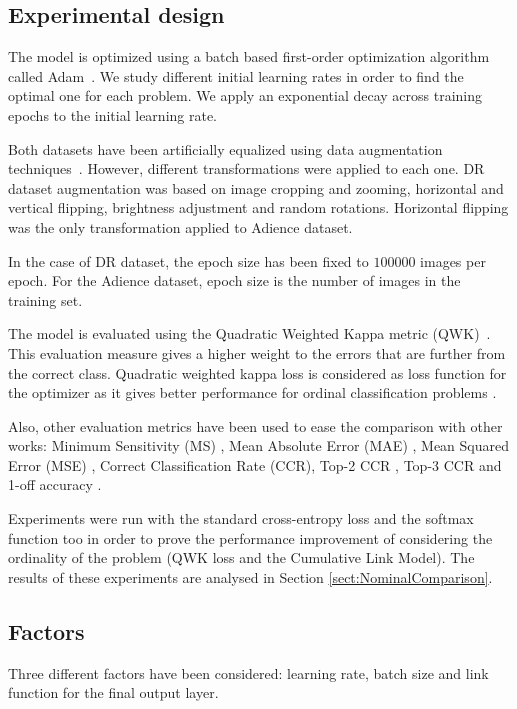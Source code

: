 \documentclass[journal]{IEEEtran}
\begin{document}
	\subsection{Experimental design}
	\label{sect:settings}
	The model is optimized using a batch based first-order optimization algorithm called Adam~\cite{kingma2014adam}. We study different initial learning rates in order to find the optimal one for each problem. We apply an exponential decay across training epochs to the initial learning rate.
	
	Both datasets have been artificially equalized using data augmentation techniques~\cite{van2001art,krizhevsky2012imagenet}. However, different transformations were applied to each one. DR dataset augmentation was based on image cropping and zooming, horizontal and vertical flipping, brightness adjustment and random rotations. Horizontal flipping was the only transformation applied to Adience dataset.
	
	In the case of DR dataset, the epoch size has been fixed to $100000$ images per epoch. For the Adience dataset, epoch size is the number of images in the training set.
	
	The model is evaluated using the Quadratic Weighted Kappa metric (QWK)~\cite{ben2008comparison}. This evaluation measure gives a higher weight to the errors that are further from the correct class.
	Quadratic weighted kappa loss is considered as loss function for the optimizer as it gives better performance for ordinal classification problems \cite{de2018weighted}.
	
	Also, other evaluation metrics have been used to ease the comparison with other works: Minimum Sensitivity (MS) \cite{cruz2014metrics}, Mean Absolute Error (MAE) \cite{cruz2014metrics}, Mean Squared Error (MSE) \cite{wang2009mean}, Correct Classification Rate (CCR), Top-2 CCR \cite{beckham2017unimodal}, Top-3 CCR \cite{beckham2017unimodal} and 1-off accuracy \cite{chen2016cascaded,levi2015age,eidinger2014age}.
	
	Experiments were run with the standard cross-entropy loss and the softmax function too in order to prove the performance improvement of considering the ordinality of the problem (QWK loss and the Cumulative Link Model). The results of these experiments are analysed in Section \ref{sect:NominalComparison}.
	
	\subsection{Factors}
	Three different factors have been considered: learning rate, batch size and link function for the final output layer.
	
\end{document}
